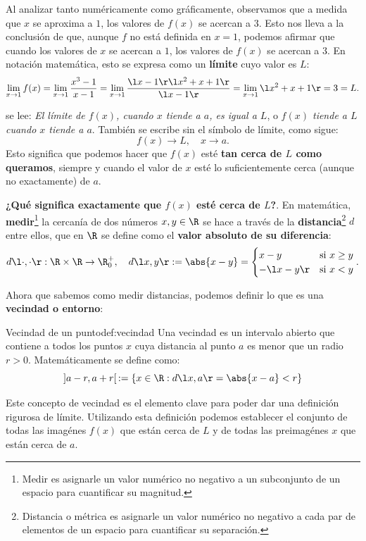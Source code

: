 Al analizar tanto numéricamente como gráficamente, observamos que a medida que $x$ se aproxima a $1$, los valores de $f(x)$ se acercan a $3$. Esto nos lleva a la conclusión de que, aunque $f$ no está definida en $x=1$, podemos afirmar que cuando los valores de $x$ se acercan a $1$, los valores de $f(x)$ se acercan a $3$. En notación matemática, esto se expresa como un \textbf{límite} cuyo valor es $L$:
\[ \lim_{x \to 1}{f(x)} = \lim_{x \to 1}{\frac{x^3 -1}{x-1}}=  \lim_{x \to 1}{\frac{\l x-1 \r \l x^2+x+1 \r}{\l x-1 \r}} = \lim_{x \to 1}{\l x^2+x+1 \r}  = 3 = L. \]

se lee: \emph{El límite de $f(x)$, cuando $x$ tiende a $a$, es igual a $L$}, o \emph{$f(x)$ tiende a $L$ cuando $x$ tiende a $a$}. También se escribe sin el símbolo de límite, como sigue:
\[ f(x) \to L, \quad x \to a. \]
Esto significa que podemos hacer que $f(x)$ esté \textbf{tan cerca de $L$ como queramos}, siempre y cuando el valor de $x$ esté lo suficientemente cerca (aunque no exactamente) de $a$.

\textbf{¿Qué significa exactamente que $f(x)$ esté cerca de $L$?}. En matemática, \textbf{medir}\footnote{Medir es asignarle un valor numérico no negativo a un subconjunto de un espacio para cuantificar su magnitud.} la cercanía de dos números $x,y \in \R$ se hace a través de la \textbf{distancia}\footnote{Distancia o métrica es asignarle un valor numérico no negativo a cada par de elementos de un espacio para cuantificar su separación.} $d$ entre ellos, que en $\R$ se define como el \textbf{valor absoluto de su diferencia}:
\[ d \l \cdot , \cdot \r: \R \times \R \to \R^{+}_0, \quad d \l x,y \r := \abs{x-y} = \begin{cases} x-y & \text{si } x \geq y \\ - \l x-y \r & \text{si } x<y \end{cases}. \]

Ahora que sabemos como medir distancias, podemos definir lo que es una \textbf{vecindad o entorno}:

\begin{definition}{Vecindad de un punto}{def:vecindad}
  Una vecindad es un intervalo abierto que contiene a todos los puntos $x$ cuya distancia al punto $a$ es menor que un radio $r>0$. Matemáticamente se define como:
  \[ ] a-r,a+r[ \, := \left\lbrace x \in \R : d \l x,a \r = \abs{x-a} < r \right\rbrace  \]
\end{definition}

Este concepto de vecindad es el elemento clave para poder dar una definición rigurosa de límite. Utilizando esta definición podemos establecer el conjunto de todas las imagénes $f(x)$ que están cerca de $L$ y de todas las preimagénes $x$ que están cerca de $a$.  

